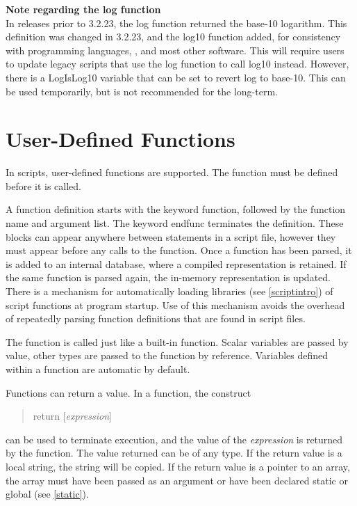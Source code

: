 {\bf Note regarding the log function}\\
In {\Xic} releases prior to 3.2.23, the {\vt log} function returned
the base-10 logarithm.  This definition was changed in 3.2.23, and
the {\vt log10} function added, for consistency with programming
languages, {\WRspice}, and most other software.  This will require
users to update legacy scripts that use the {\vt log} function to
call {\vt log10} instead.  However, there is a {\et LogIsLog10}
variable that can be set to revert {\vt log} to base-10.  This can be
used temporarily, but is not recommended for the long-term.

\section{User-Defined Functions}
\label{functions}
In scripts, user-defined functions are supported.  The function must
be defined before it is called.

A function definition starts with the keyword {\vt function}, followed
by the function name and argument list.  The keyword {\vt endfunc}
terminates the definition.  These blocks can appear anywhere between
statements in a script file, however they must appear before any calls
to the function.  Once a function has been parsed, it is added to an
internal database, where a compiled representation is retained.  If
the same function is parsed again, the in-memory representation is
updated.  There is a mechanism for automatically loading libraries
(see \ref{scriptintro}) of script functions at program startup.  Use
of this mechanism avoids the overhead of repeatedly parsing function
definitions that are found in script files.

The function is called just like a built-in function.  Scalar
variables are passed by value, other types are passed to the function
by reference.  Variables defined within a function are automatic by
default.

Functions can return a value.  In a function, the construct
\begin{quote}\vt
return [{\it expression\/}]
\end{quote}
can be used to terminate execution, and the value of the {\it
expression} is returned by the function.  The value returned can be
of any type.  If the return value is a local string, the string will
be copied.  If the return value is a pointer to an array, the array
must have been passed as an argument or have been declared {\vt
static} or {\vt global} (see \ref{static}).

